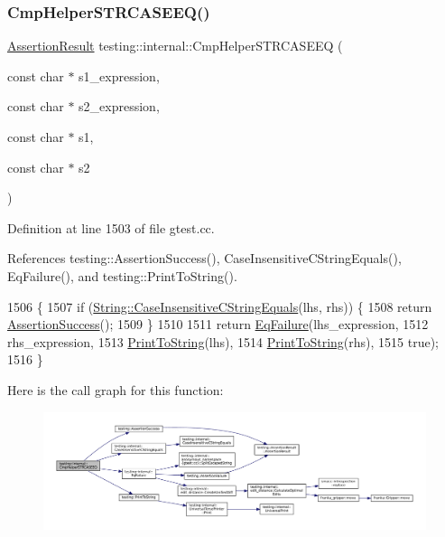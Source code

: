 \subsubsection{\texorpdfstring{Cmp\+Helper\+S\+T\+R\+C\+A\+S\+E\+E\+Q()}{CmpHelperSTRCASEEQ()}}
{\footnotesize\ttfamily \hyperlink{classtesting_1_1AssertionResult}{Assertion\+Result} testing\+::internal\+::\+Cmp\+Helper\+S\+T\+R\+C\+A\+S\+E\+EQ (\begin{DoxyParamCaption}\item[{const char $\ast$}]{s1\+\_\+expression,  }\item[{const char $\ast$}]{s2\+\_\+expression,  }\item[{const char $\ast$}]{s1,  }\item[{const char $\ast$}]{s2 }\end{DoxyParamCaption})}



Definition at line 1503 of file gtest.\+cc.



References testing\+::\+Assertion\+Success(), Case\+Insensitive\+C\+String\+Equals(), Eq\+Failure(), and testing\+::\+Print\+To\+String().


\begin{DoxyCode}
1506                                                     \{
1507   \textcolor{keywordflow}{if} (\hyperlink{namespacetesting_1_1internal_aebfd0cd34de52d7973a5b2d03ba848cf}{String::CaseInsensitiveCStringEquals}(lhs, rhs)) \{
1508     \textcolor{keywordflow}{return} \hyperlink{namespacetesting_ac1d0baedb17286c5c6c87bd1a45da8ac}{AssertionSuccess}();
1509   \}
1510 
1511   \textcolor{keywordflow}{return} \hyperlink{namespacetesting_1_1internal_a08725846ff184d3e79bcf5be4df19157}{EqFailure}(lhs\_expression,
1512                    rhs\_expression,
1513                    \hyperlink{namespacetesting_aa5717bb1144edd1d262d310ba70c82ed}{PrintToString}(lhs),
1514                    \hyperlink{namespacetesting_aa5717bb1144edd1d262d310ba70c82ed}{PrintToString}(rhs),
1515                    \textcolor{keyword}{true});
1516 \}
\end{DoxyCode}
Here is the call graph for this function\+:
\nopagebreak
\begin{figure}[H]
\begin{center}
\leavevmode
\includegraphics[width=350pt]{namespacetesting_1_1internal_a30dfeb01f1bc8087c7d05205d5fa75c1_cgraph}
\end{center}
\end{figure}
\mbox{\label{namespacetesting_1_1internal_a7e31d489f06ab8f6a81a7729f0c377e7}} 
